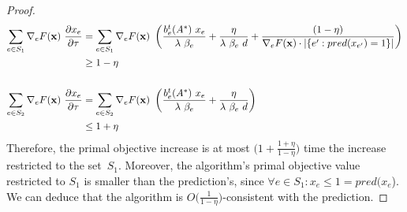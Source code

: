 \begin{proof}
\begin{align*}
\sum_{e \in S_{1}} \nabla_{e} F(\mathbf{x})\ \frac{\partial x_{e}}{ \partial \tau}
&= \sum_{e \in S_{1}} \nabla_{e} F(\mathbf{x})
	\ \left( \frac{b^{t}_{e}(A^{*}) \ x_{e}}{\lambda\ \beta_{e}} + \frac{\eta}{\lambda\ \beta_{e}\ d}
		 + \frac{(1 - \eta)}{\nabla_{e} F(\mathbf{x}) \cdot |\{e': pred(x_{e'}) = 1\}| }
 \right)\\
 &\geq 1 - \eta \\ \\
 \sum_{e \in S_{2}} \nabla_{e} F(\mathbf{x})\ \frac{\partial x_{e}}{ \partial \tau}
&= \sum_{e \in S_{2}} \nabla_{e} F(\mathbf{x})
	\ \left( \frac{b^{t}_{e}(A^{*}) \ x_{e}}{\lambda\ \beta_{e}} + \frac{\eta}{\lambda\ \beta_{e}\ d} \right)\\
&\leq 1 + \eta
\end{align*}
Therefore, the primal objective increase is at most $\bigl(1 +  \frac{1 + \eta}{1 - \eta} \bigr)$ time the increase restricted to
the set~$S_{1}$. Moreover, the algorithm's primal objective value restricted to $S_{1}$ is smaller than
the prediction's, since $\forall e \in S_{1} : x_{e} \leq 1 = pred(x_{e}$).
We can deduce that the algorithm is $O\bigl( \frac{1}{1 - \eta} \bigr)$-consistent with the prediction.
\end{proof}


